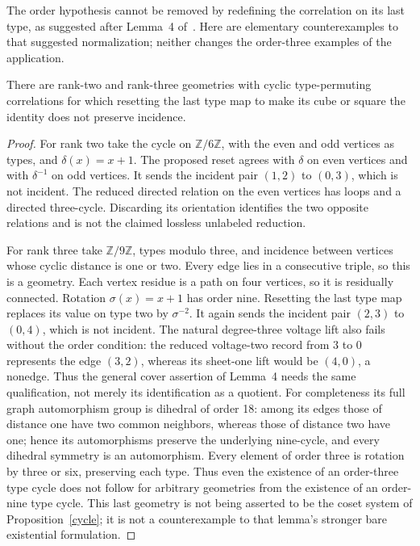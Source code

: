 \documentclass[11pt,a4paper]{article}
\begin{document}
The order hypothesis cannot be removed by redefining the correlation on
its last type, as suggested after Lemma~4 of~\cite{LS}. Here are elementary
counterexamples to that suggested normalization; neither changes the
order-three examples of the application.

\begin{proposition}\label{normalization}
There are rank-two and rank-three geometries with cyclic type-permuting
correlations for which resetting the last type map to make its cube or
square the identity does not preserve incidence.
\end{proposition}
\begin{proof}
For rank two take the cycle on $\mathbb Z/6\mathbb Z$, with the even and odd
vertices as types, and $\delta(x)=x+1$. The proposed reset agrees with
$\delta$ on even vertices and with $\delta^{-1}$ on odd vertices.
It sends the incident pair $(1,2)$ to $(0,3)$, which is not incident.
The reduced directed relation on the even vertices has loops and a directed
three-cycle. Discarding its orientation identifies the two opposite
relations and is not the claimed lossless unlabeled reduction.

For rank three take $\mathbb Z/9\mathbb Z$, types modulo three, and incidence
between vertices whose cyclic distance is one or two. Every edge lies in a
consecutive triple, so this is a geometry. Each vertex residue is a path on
four vertices, so it is residually connected. Rotation $\sigma(x)=x+1$ has
order nine. Resetting the last type map replaces its value on type two by
$\sigma^{-2}$. It again sends the incident pair $(2,3)$ to $(0,4)$,
which is not incident. The natural degree-three voltage lift also fails
without the order condition: the reduced voltage-two record from $3$ to $0$
represents the edge $(3,2)$, whereas its sheet-one lift would be $(4,0)$,
a nonedge. Thus the general cover assertion of Lemma~4 needs the same
qualification, not merely its identification as a quotient.
For completeness its full graph automorphism group is dihedral of order 18:
among its edges those of distance one have two common neighbors, whereas
those of distance two have one; hence its automorphisms preserve the
underlying nine-cycle, and every dihedral symmetry is an automorphism.
Every element of order three is rotation by three or six, preserving each
type. Thus even the existence of an order-three type cycle does not follow
for arbitrary geometries from the existence of an order-nine type cycle.
This last geometry is not being asserted to be the coset system of
Proposition~\ref{cycle}; it is not a counterexample to that lemma's stronger
bare existential formulation.
\end{proof}
\end{document}
